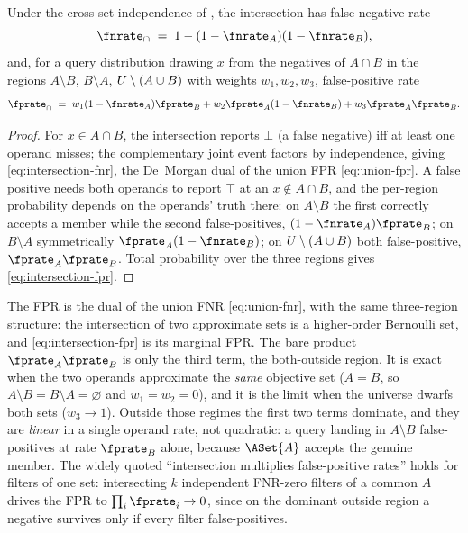 \begin{proposition}
\label{prop:intersection-fpr-fnr}
Under the cross-set independence of , the
intersection has false-negative rate
\begin{equation}
\label{eq:intersection-fnr}
  \fnrate_\cap \;=\; 1 - (1 - \fnrate_A)(1 - \fnrate_B),
\end{equation}
and, for a query distribution drawing $x$ from the negatives of $A \cap B$
in the regions $A \setminus B$, $B \setminus A$,
$U \setminus (A \cup B)$ with weights $w_1, w_2, w_3$,
false-positive rate
\begin{equation}
\label{eq:intersection-fpr}
  \fprate_\cap
  \;=\; w_1 (1 - \fnrate_A)\fprate_B
        + w_2 \fprate_A (1 - \fnrate_B)
        + w_3 \fprate_A \fprate_B.
\end{equation}
\end{proposition}

\begin{proof}
For $x \in A \cap B$, the intersection reports $\bot$ (a false negative) iff
at least one operand misses; the complementary joint event factors by
independence, giving \eqref{eq:intersection-fnr}, the De~Morgan
dual of the union FPR \eqref{eq:union-fpr}. A false positive needs both operands to
report $\top$ at an $x \notin A \cap B$, and the per-region probability
depends on the operands' truth there: on $A \setminus B$ the first correctly
accepts a member while the second false-positives, $(1 - \fnrate_A)\fprate_B$;
on $B \setminus A$ symmetrically $\fprate_A(1 - \fnrate_B)$; on
$U \setminus (A \cup B)$ both false-positive, $\fprate_A \fprate_B$.
Total probability over the three regions gives \eqref{eq:intersection-fpr}.
\end{proof}

The FPR is the dual of the union FNR \eqref{eq:union-fnr}, with the same
three-region structure: the intersection of two approximate sets is a
higher-order Bernoulli set, and \eqref{eq:intersection-fpr} is its marginal
FPR. The bare product $\fprate_A \fprate_B$ is only the third term, the
both-outside region. It is exact when the two operands approximate the
\emph{same} objective set ($A = B$, so $A \setminus B = B \setminus A =
\varnothing$ and $w_1 = w_2 = 0$), and it is the limit when the universe
dwarfs both sets ($w_3 \to 1$). Outside those regimes the first two terms
dominate, and they are \emph{linear} in a single operand rate, not
quadratic: a query landing in $A \setminus B$ false-positives at rate
$\fprate_B$ alone, because $\ASet{A}$ accepts the genuine member. The widely
quoted ``intersection multiplies false-positive rates'' holds for filters of
one set: intersecting $k$ independent FNR-zero filters of a common $A$ drives
the FPR to $\prod_i \fprate_i \to 0$, since on the dominant outside region a
negative survives only if every filter false-positives.

